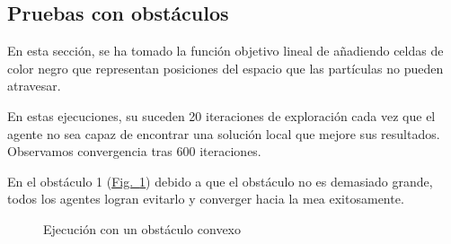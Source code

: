 \documentclass[runningheads]{llncs}
\newcommand{\refcruzada}[2]{\hyperref[#2]{#1~\ref{#2}}}
\begin{document}
    \subsection{Pruebas con obstáculos}

    En esta sección, se ha tomado la función objetivo lineal de \cite{initialPaper} añadiendo celdas de color negro que representan posiciones del espacio que las partículas no pueden atravesar.

    En estas ejecuciones, su suceden 20 iteraciones de exploración cada vez que el agente no sea capaz de encontrar una solución local que mejore sus resultados. Observamos convergencia tras 600 iteraciones.

    En el obstáculo 1 (\refcruzada{Fig.}{fig:6}) debido a que el obstáculo no es demasiado grande, todos los agentes logran evitarlo y converger hacia la mea exitosamente.

    \begin{figure}[htbp]
        \centering
        \caption{Ejecución con un obstáculo convexo}
        \label{fig:6}
    \end{figure}
\end{document}
